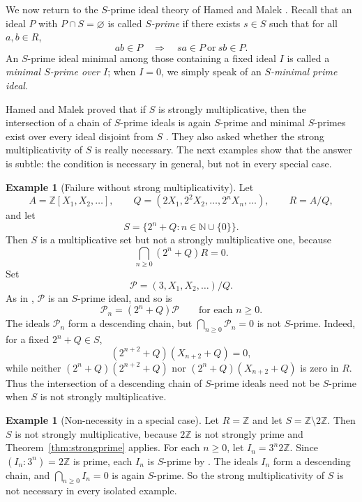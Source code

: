\documentclass[11pt]{amsart}
\theoremstyle{definition}
\newtheorem{example}[theorem]{Example}
\theoremstyle{remark}
\begin{document}
We now return to the $S$-prime ideal theory of Hamed and Malek \cite{Hamed}.
Recall that an ideal $P$ with $P \cap S=\varnothing$ is called \emph{$S$-prime} if there exists $s \in S$ such that for all $a,b \in R$,
\[
ab \in P
\quad\Longrightarrow\quad
sa \in P \ \text{or}\ sb \in P.
\]
An $S$-prime ideal minimal among those containing a fixed ideal $I$ is called a \emph{minimal $S$-prime over $I$}; when $I=0$, we simply speak of an \emph{$S$-minimal prime ideal}.

Hamed and Malek proved that if $S$ is strongly multiplicative, then the intersection of a chain of $S$-prime ideals is again $S$-prime and minimal $S$-primes exist over every ideal disjoint from $S$ \cite[Proposition~5]{Hamed}.
They also asked whether the strong multiplicativity of $S$ is really necessary.
The next examples show that the answer is subtle: the condition is necessary in general, but not in every special case.

\begin{example}[Failure without strong multiplicativity]\label{ex:counter1}
Let
\[
A=\mathbb{Z}[X_1,X_2,\ldots],
\qquad
Q=(2X_1,2^2X_2,\ldots,2^nX_n,\ldots),
\qquad
R=A/Q,
\]
and let
\[
S=\{2^n+Q : n \in \mathbb{N}\cup\{0\}\}.
\]
Then $S$ is a multiplicative set but not a strongly multiplicative one, because
\[
\bigcap_{n \geq 0}(2^n+Q)R=0.
\]
Set
\[
\mathcal P=(3,X_1,X_2,\ldots)/Q.
\]
As in \cite{Hamed}, $\mathcal P$ is an $S$-prime ideal, and so is
\[
\mathcal P_n=(2^n+Q)\mathcal P
\qquad\text{for each } n \geq 0.
\]
The ideals $\mathcal P_n$ form a descending chain, but $\bigcap_{n \geq 0}\mathcal P_n=0$ is not $S$-prime.
Indeed, for a fixed $2^n+Q \in S$,
\[
(2^{n+2}+Q)(X_{n+2}+Q)=0,
\]
while neither $(2^n+Q)(2^{n+2}+Q)$ nor $(2^n+Q)(X_{n+2}+Q)$ is zero in $R$.
Thus the intersection of a descending chain of $S$-prime ideals need not be $S$-prime when $S$ is not strongly multiplicative.
\end{example}

\begin{example}[Non-necessity in a special case]\label{ex:counter2}
Let $R=\mathbb{Z}$ and let $S=\mathbb{Z}\setminus 2\mathbb{Z}$.
Then $S$ is not strongly multiplicative, because $2\mathbb{Z}$ is not strongly prime and Theorem~\ref{thm:strongprime} applies.
For each $n \geq 0$, let $I_n=3^n2\mathbb{Z}.$
Since $(I_n:3^n)=2\mathbb{Z}$ is prime, each $I_n$ is $S$-prime by \cite[Proposition~1]{Hamed}.
The ideals $I_n$ form a descending chain, and $\bigcap_{n \geq 0} I_n=0$ is again $S$-prime.
So the strong multiplicativity of $S$ is not necessary in every isolated example.
\end{example}
\end{document}
